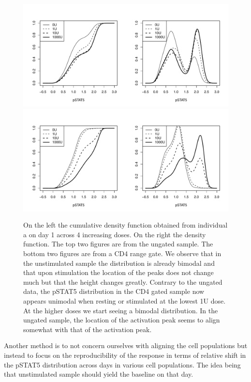 \begin{figure}[h]
    \centering
    \includegraphics[scale=.5]{IL2/figures/ungated-dose-effect.pdf}
    \includegraphics[scale=.5]{IL2/figures/lymph-dose-effect.pdf}
    \caption{  \label{figure:dose-effect}
        On the left the cumulative density function obtained from individual a on day 1 across 4 increasing doses.
        On the right the density function.
        The top two figures are from the ungated sample.
        The bottom two figures are from a CD4 range gate.
        We observe that in the unstimulated sample the distribution is already bimodal 
        and that upon stimulation the location of the peaks does not change much but that the height changes greatly.
        Contrary to the ungated data, the pSTAT5 distribution in the CD4 gated sample now appears unimodal when resting or stimulated
        at the lowest 1U dose.  At the higher doses we start seeing a bimodal distribution.
        In the ungated sample, the location of the activation peak seems to align somewhat with that of the activation peak.  }
\end{figure}

Another method is to not concern ourselves with aligning the cell populations but instead to focus on the reproducibility of the response in terms of relative shift in the pSTAT5 distribution
across days in various cell populations.
The idea being that unstimulated sample should yield the baseline on that day.



